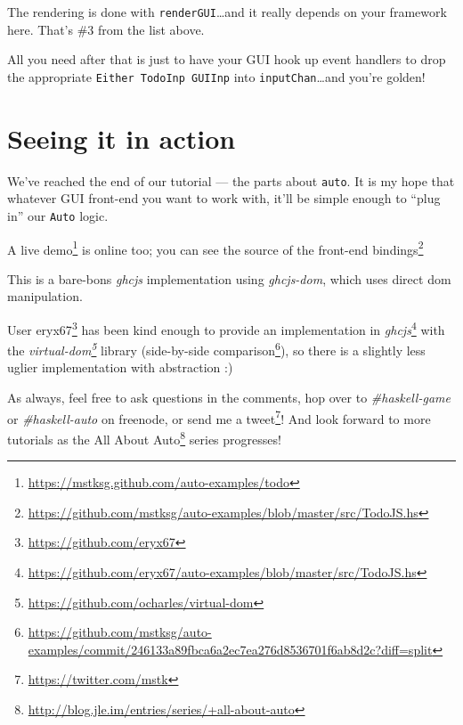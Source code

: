 \documentclass[]{article}
\renewcommand{\href}[2]{#2\footnote{\url{#1}}}
\begin{document}
The rendering is done with \texttt{renderGUI}\ldots{}and it really depends on
your framework here. That's \#3 from the list above.

All you need after that is just to have your GUI hook up event handlers to drop
the appropriate \texttt{Either\ TodoInp\ GUIInp} into
\texttt{inputChan}\ldots{}and you're golden!

\section{Seeing it in action}\label{seeing-it-in-action}

We've reached the end of our tutorial --- the parts about \texttt{auto}. It is
my hope that whatever GUI front-end you want to work with, it'll be simple
enough to ``plug in'' our \texttt{Auto} logic.

A \href{https://mstksg.github.com/auto-examples/todo}{live demo} is online too;
you can see
\href{https://github.com/mstksg/auto-examples/blob/master/src/TodoJS.hs}{the
source of the front-end bindings}

This is a bare-bons \emph{ghcjs} implementation using \emph{ghcjs-dom}, which
uses direct dom manipulation.

User \href{https://github.com/eryx67}{eryx67} has been kind enough to provide
\href{https://github.com/eryx67/auto-examples/blob/master/src/TodoJS.hs}{an
implementation in \emph{ghcjs}} with the
\emph{\href{https://github.com/ocharles/virtual-dom}{virtual-dom}} library
(\href{https://github.com/mstksg/auto-examples/commit/246133a89fbca6a2ec7ea276d8536701f6ab8d2c?diff=split}{side-by-side
comparison}), so there is a slightly less uglier implementation with abstraction
:)

As always, feel free to ask questions in the comments, hop over to
\emph{\#haskell-game} or \emph{\#haskell-auto} on freenode, or send me a
\href{https://twitter.com/mstk}{tweet}! And look forward to more tutorials as
the \href{http://blog.jle.im/entries/series/+all-about-auto}{All About Auto}
series progresses!
\end{document}
